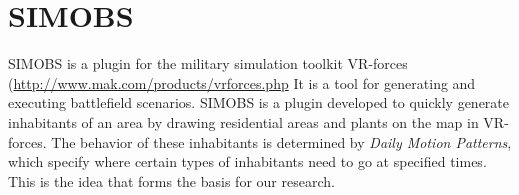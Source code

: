 \documentclass[11pt]{book}
\begin{document}

\section{SIMOBS}
SIMOBS is a plugin for the military simulation toolkit VR-forces (\url{http://www.mak.com/products/vrforces.php} It is a tool for generating and executing battlefield scenarios. SIMOBS is a plugin developed to quickly generate inhabitants of an area by drawing residential areas and plants on the map in VR-forces. The behavior of these inhabitants is determined by \emph{Daily Motion Patterns}, which specify where certain types of inhabitants need to go at specified times. This is the idea that forms the basis for our research.


\end{document}
